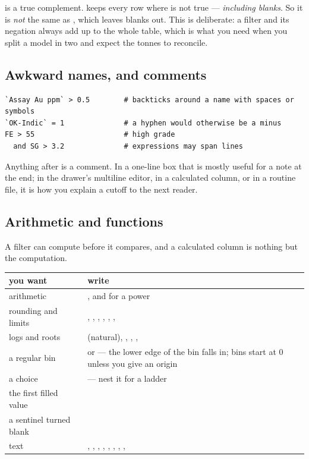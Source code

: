 \begin{caution}
 is a true complement.  keeps every row where  is not true — \emph{including blanks}. So it is \emph{not} the same as , which leaves blanks out. This is deliberate: a filter and its negation always add up to the whole table, which is what you need when you split a model in two and expect the tonnes to reconcile.
\end{caution}

\subsection{Awkward names, and comments}
\begin{lstlisting}[language=expr]
`Assay Au ppm` > 0.5        # backticks around a name with spaces or symbols
`OK-Indic` = 1              # a hyphen would otherwise be a minus
FE > 55                     # high grade
  and SG > 3.2              # expressions may span lines
\end{lstlisting}

Anything after \code{\#} is a comment. In a one-line box that is mostly useful for a note at the end; in the drawer's multiline editor, in a calculated column, or in a routine file, it is how you explain a cutoff to the next reader.

\subsection{Arithmetic and functions}
A filter can compute before it compares, and a calculated column is nothing but the computation.

\begin{center}
\begin{tabularx}{\linewidth}{@{}lL@{}}\toprule
you want & write \\ \midrule
arithmetic & \code{+ - * /}, and \code{\textasciicircum} for a power \\
rounding and limits & , , , , , ,  \\
logs and roots &  (natural), , , ,  \\
a regular bin &  or  — the lower edge of the bin  falls in; bins start at 0 unless you give an origin \\
a choice &  — nest it for a ladder \\
the first filled value &  \\
a sentinel turned blank &  \\
text & , , , , , , , ,  \\ \bottomrule
\end{tabularx}
\end{center}

